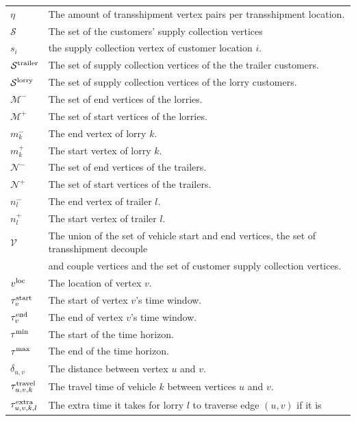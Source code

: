\begin{longtable}{ll}
$\eta$ & The amount of transshipment vertex pairs per transshipment location. \\
$\mathcal S$ & The set of the customers' supply collection vertices \\
$s_i$ & the supply collection vertex of customer location $i$. \\
$\mathcal S^{\rm trailer}$ & The set of supply collection vertices of the the trailer customers.  \\
$\mathcal S^{\rm lorry}$ & The set of supply collection vertices of the lorry customers. \\
$\mathcal M^-$ & The set of end vertices of the lorries.\\
$\mathcal M^+$ & The set of start vertices of the lorries. \\
$m^-_k$ & The end vertex of lorry $k$. \\
$m^+_k$ & The start vertex of lorry $k$. \\
$\mathcal N^-$ & The set of end vertices of the trailers.\\
$\mathcal N^+$ & The set of start vertices of the trailers. \\
$n^-_l$ & The end vertex of trailer $l$. \\
$n^+_l$ & The start vertex of trailer $l$. \\
$\mathcal V$ & The union of the set of vehicle start and end vertices, the set of transshipment decouple \\
& and couple vertices and the set of customer supply collection vertices.  \\
$v^{\rm loc} $ & The location of vertex $v$. \\
$\tau^{\rm start}_v $ & The start of vertex $v$'s time window. \\
$\tau^{\rm end}_v $ & The end of vertex $v$'s time window. \\
$\tau^{\rm min} $ & The start of the time horizon. \\
$\tau^{\rm max} $ & The end of the time horizon. \\
$\delta_{u,v} $ & The distance between vertex $u$ and $v$. \\
$\tau^{\rm travel}_{u,v,k} $ & The travel time of vehicle $k$ between vertices $u$ and $v$.\\
$\tau^{\rm extra}_{u,v,k,l} $ & The extra time it takes for lorry $l$ to traverse edge $(u,v)$ if it is \\

\end{longtable}
